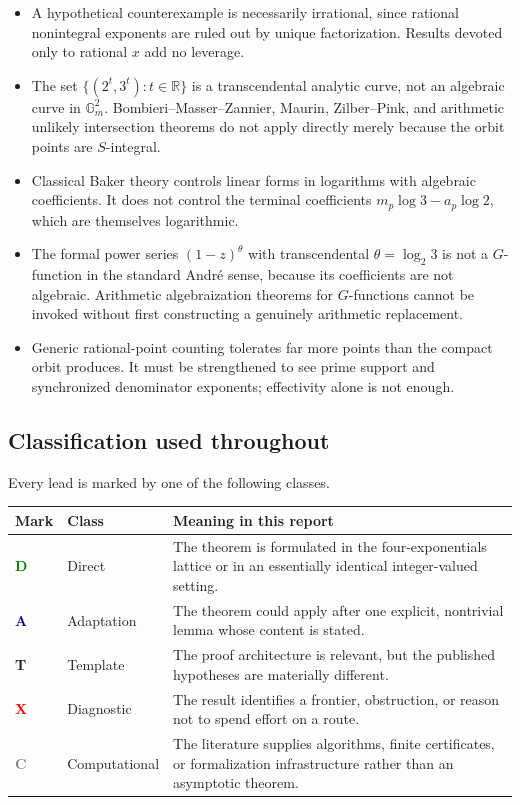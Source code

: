 \documentclass[10pt,letterpaper]{article}
\newcommand{\R}{\mathbb R}
\newcommand{\Gm}{\mathbb G_m}
\newcommand{\badgeDirect}{\textcolor{green}{\textbf{D}}}
\newcommand{\badgeAdapt}{\textcolor{navy}{\textbf{A}}}
\newcommand{\badgeTemplate}{\textcolor{amber}{\textbf{T}}}
\newcommand{\badgeDiagnostic}{\textcolor{red}{\textbf{X}}}
\newcommand{\badgeCompute}{\textcolor{graytext}{\textbf{C}}}
\begin{document}
\begin{itemize}
\item A hypothetical counterexample is necessarily irrational, since rational nonintegral
exponents are ruled out by unique factorization.  Results devoted only to rational \(x\) add
no leverage.
\item The set \(\{(2^t,3^t):t\in\R\}\) is a transcendental analytic curve, not an algebraic
curve in \(\Gm^2\).  Bombieri--Masser--Zannier, Maurin, Zilber--Pink, and arithmetic unlikely
intersection theorems do not apply directly merely because the orbit points are
\(S\)-integral.
\item Classical Baker theory controls linear forms in logarithms with algebraic
coefficients.  It does not control the terminal coefficients
\(m_p\log 3-a_p\log 2\), which are themselves logarithmic.
\item The formal power series \((1-z)^\theta\) with transcendental \(\theta=\log_2 3\) is not
a \(G\)-function in the standard Andr\'e sense, because its coefficients are not algebraic.
Arithmetic algebraization theorems for \(G\)-functions cannot be invoked without first
constructing a genuinely arithmetic replacement.
\item Generic rational-point counting tolerates far more points than the compact orbit
produces.  It must be strengthened to see prime support and synchronized denominator
exponents; effectivity alone is not enough.
\end{itemize}

\subsection{Classification used throughout}

Every lead is marked by one of the following classes.

\begin{center}
\begin{tabularx}{0.96\textwidth}{C{0.08\textwidth}L{0.18\textwidth}Y}
\toprule
Mark & Class & Meaning in this report\\
\midrule
\badgeDirect & Direct & The theorem is formulated in the four-exponentials lattice or in an
essentially identical integer-valued setting.\\
\badgeAdapt & Adaptation & The theorem could apply after one explicit, nontrivial lemma whose
content is stated.\\
\badgeTemplate & Template & The proof architecture is relevant, but the published hypotheses
are materially different.\\
\badgeDiagnostic & Diagnostic & The result identifies a frontier, obstruction, or reason not to
spend effort on a route.\\
\badgeCompute & Computational & The literature supplies algorithms, finite certificates, or
formalization infrastructure rather than an asymptotic theorem.\\
\bottomrule
\end{tabularx}
\end{center}
\end{document}
